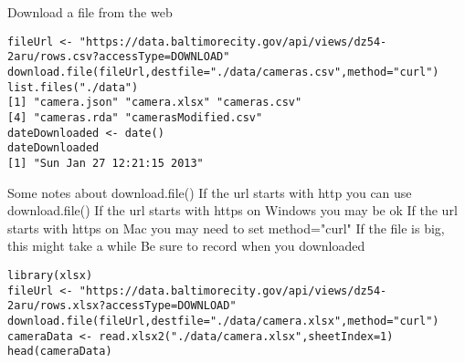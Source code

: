 Download a file from the web
\begin{verbatim}
fileUrl <- "https://data.baltimorecity.gov/api/views/dz54-2aru/rows.csv?accessType=DOWNLOAD"
download.file(fileUrl,destfile="./data/cameras.csv",method="curl")
list.files("./data")
[1] "camera.json" "camera.xlsx" "cameras.csv"
[4] "cameras.rda" "camerasModified.csv"
dateDownloaded <- date()
dateDownloaded
[1] "Sun Jan 27 12:21:15 2013"
\end{verbatim}

Some notes about download.file()
If the url starts with http you can use download.file()
If the url starts with https on Windows you may be ok
If the url starts with https on Mac you may need to set method="curl"
If the file is big, this might take a while
Be sure to record when you downloaded

\begin{verbatim}
library(xlsx)
fileUrl <- "https://data.baltimorecity.gov/api/views/dz54-2aru/rows.xlsx?accessType=DOWNLOAD"
download.file(fileUrl,destfile="./data/camera.xlsx",method="curl")
cameraData <- read.xlsx2("./data/camera.xlsx",sheetIndex=1)
head(cameraData)
\end{verbatim}
